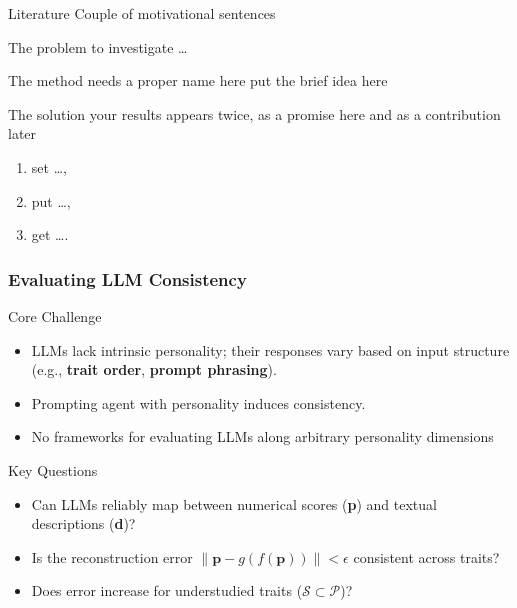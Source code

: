 \documentclass[12pt,pdf,hyperref={unicode}]{beamer}
\begin{document}
\begin{frame}{Literature}
Couple of motivational sentences
\begin{block}{The problem}
to investigate \ldots 
\end{block}
\begin{block}{The method needs a proper name here}
put the brief idea here
\end{block}
\begin{block}{The solution} your results appears twice, as a promise here and as a contribution later
\begin{enumerate}[1)]
\item set \ldots,
\item put \ldots,
\item get \ldots.
\end{enumerate}
\end{block}
\end{frame}


\begin{frame}
\frametitle{Evaluating LLM Consistency}
\begin{block}{Core Challenge}
\begin{itemize}
    \item LLMs lack intrinsic personality; their responses vary based on input structure (e.g., \textbf{trait order}, \textbf{prompt phrasing}).
    \item Prompting agent with personality induces consistency.
    \item No frameworks for evaluating LLMs along arbitrary personality dimensions 
\end{itemize}
\end{block}

\begin{block}{Key Questions}
\begin{itemize}
    \item Can LLMs reliably map between numerical scores (\textbf{p}) and textual descriptions (\textbf{d})?
    \item Is the reconstruction error $\|\mathbf{p} - g(f(\mathbf{p}))\| < \epsilon$ consistent across traits?
    \item Does error increase for understudied traits ($\mathcal{S} \subset \mathcal{P}$)?
\end{itemize}
\end{block}


\end{frame}
\end{document}
